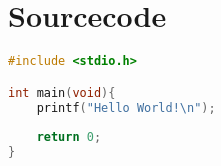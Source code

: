 \chapter{Sourcecode}
	\begin{lstlisting}[language=C, caption={Ein Beispielhafter Quellcode}]
#include <stdio.h>

int main(void){
	printf("Hello World!\n");
	
	return 0;
}
	\end{lstlisting}